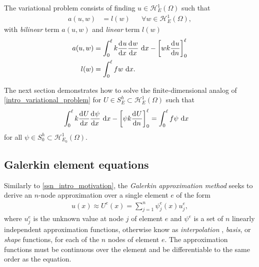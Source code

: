 The variational problem consists of finding $u \in \mathscr{H}_E^1(\Omega)$ such that
\begin{align}
  \label{intro_variational_problem}
  a(u,w) &= l(w) && \forall w \in \mathscr{H}_E^1(\Omega),
\end{align}
with  \emph{bilinear} term $a(u,w)$ and \emph{linear} term $l(w)$ \citep{reddy_1993}
\begin{align*}
  a(u,w) &= \int_0^{\ell} k \frac{\mathrm{d}{^{}} u}{\mathrm{d} x{^{}} } \frac{\mathrm{d}{^{}} w}{\mathrm{d} x{^{}} } \ \mathrm{d}x - \left[ wk\frac{\mathrm{d}{^{}} u}{\mathrm{d} n{^{}} }\right]_0^{\ell} \\
  l(w)   &= \int_0^{\ell} f w \ \mathrm{d}x.
\end{align*}

The next section demonstrates how to solve the finite-dimensional analog of \cref{intro_variational_problem} for $U \in S_E^h \subset \mathscr{H}_E^1(\Omega)$ such that
\begin{align}
  \label{intro_discrete_variational_problem}
  \int_0^{\ell} k \frac{\mathrm{d}{^{}} U}{\mathrm{d} x{^{}} } \frac{\mathrm{d}{^{}} \psi}{\mathrm{d} x{^{}} } \ \mathrm{d}x - \left[ \psi k \frac{\mathrm{d}{^{}} U}{\mathrm{d} n{^{}} }\right]_0^{\ell} &= \int_0^{\ell} f \psi \ \mathrm{d}x
\end{align}
for all $\psi \in S_0^h \subset \mathscr{H}_{E_0}^1(\Omega)$.

\subsection{Galerkin element equations} \label{ssn_intro_galerkin_equations}

Similarly to \cref{ssn_intro_motivation}, the  \emph{Galerkin approximation method} seeks to derive an $n$-node approximation over a single element $e$ of the form
\begin{align}
  \label{intro_approximation}
  u(x) \approx U^e(x) = \sum_{j=1}^n \psi_j^e(x) u_j^e,
\end{align}
where $u_j^e$ is the unknown value at node $j$ of element $e$ and $\psi^e$ is a set of $n$ linearly independent approximation functions, otherwise know as   \emph{interpolation} , \emph{basis}, or \emph{shape} functions, for each of the $n$ nodes of element $e$.  The approximation functions must be continuous over the element and be differentiable to the same order as the equation.

